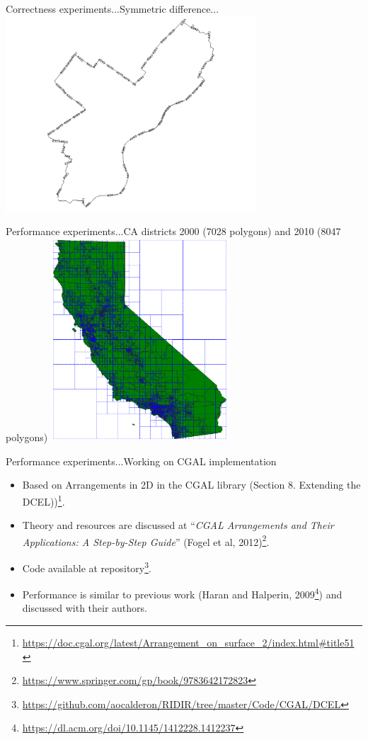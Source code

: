 \documentclass{beamer}
\begin{document}
\begin{frame}{Correctness experiments...}{Symmetric difference...}
    \centering
	\includegraphics[trim=1cm 0 1cm 0, clip, width=0.7\textwidth]{figures/06-Correctness/Phili_Symmetric}
\end{frame}

\begin{frame}{Performance experiments...}{CA districts 2000 (7028 polygons) and 2010 (8047 polygons)}
    \centering
	\includegraphics[trim=1cm 0 1cm 0, clip, width=0.5\textwidth]{figures/06-Correctness/CA_Faces}
\end{frame}

\begin{frame}{Performance experiments...}{Working on CGAL implementation}
    \begin{itemize}
        \item Based on Arrangements in 2D in the CGAL library (Section 8. Extending the DCEL))\footnote{\tiny \url{https://doc.cgal.org/latest/Arrangement_on_surface_2/index.html\#title51}}.
        \item Theory and resources are discussed at ``\textit{CGAL Arrangements and Their Applications: A Step-by-Step Guide}'' (Fogel et al, 2012)\footnote{\tiny \url{https://www.springer.com/gp/book/9783642172823}}.
        \item Code available at repository\footnote{\tiny \url{https://github.com/aocalderon/RIDIR/tree/master/Code/CGAL/DCEL}}.
        \item Performance is similar to previous work (Haran and Halperin, 2009\footnote{\tiny \url{https://dl.acm.org/doi/10.1145/1412228.1412237}}) and discussed with their authors.
    \end{itemize}
\end{frame}
\end{document}
